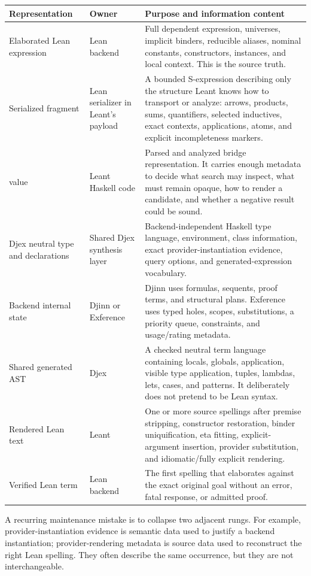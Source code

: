 \documentclass[10pt,letterpaper,oneside]{report}
\newcommand{\code}[1]{\texttt{\detokenize{#1}}}
\begin{document}
\begin{longtable}{@{}L{0.18\textwidth}L{0.27\textwidth}L{0.47\textwidth}@{}}
\toprule
\textbf{Representation} & \textbf{Owner} & \textbf{Purpose and information content} \\
\midrule
\endhead
Elaborated Lean expression & Lean backend & Full dependent expression, universes, implicit binders, reducible aliases, nominal constants, constructors, instances, and local context. This is the source truth. \\
Serialized fragment & Lean serializer in Leant's payload & A bounded S-expression describing only the structure Leant knows how to transport or analyze: arrows, products, sums, quantifiers, selected inductives, exact contexts, applications, atoms, and explicit incompleteness markers. \\
\code{Frag} value & Leant Haskell code & Parsed and analyzed bridge representation. It carries enough metadata to decide what search may inspect, what must remain opaque, how to render a candidate, and whether a negative result could be sound. \\
Djex neutral type and declarations & Shared Djex synthesis layer & Backend-independent Haskell type language, environment, class information, exact provider-instantiation evidence, query options, and generated-expression vocabulary. \\
Backend internal state & Djinn or Exference & Djinn uses formulas, sequents, proof terms, and structural plans. Exference uses typed holes, scopes, substitutions, a priority queue, constraints, and usage/rating metadata. \\
Shared generated AST & Djex & A checked neutral term language containing locals, globals, application, visible type application, tuples, lambdas, lets, cases, and patterns. It deliberately does not pretend to be Lean syntax. \\
Rendered Lean text & Leant & One or more source spellings after premise stripping, constructor restoration, binder uniquification, eta fitting, explicit-argument insertion, provider substitution, and idiomatic/fully explicit rendering. \\
Verified Lean term & Lean backend & The first spelling that elaborates against the exact original goal without an error, fatal response, or admitted proof. \\
\bottomrule
\end{longtable}

A recurring maintenance mistake is to collapse two adjacent rungs. For example, provider-instantiation evidence is semantic data used to justify a backend instantiation; provider-rendering metadata is source data used to reconstruct the right Lean spelling. They often describe the same occurrence, but they are not interchangeable.
\end{document}
